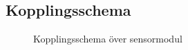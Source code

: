 \documentclass[11pt]{article}
\begin{document}
\begin{flushleft}



\pagebreak
\appendix
\setcounter{section}{14}
\section{Kopplingsschema}

\begin{figure}[htbp]
\centering
\noindent{}
	\caption{Kopplingsschema över sensormodul \label{kopplingsschema:sensormodul}}	
\end{figure}


\end{flushleft}
\end{document}
